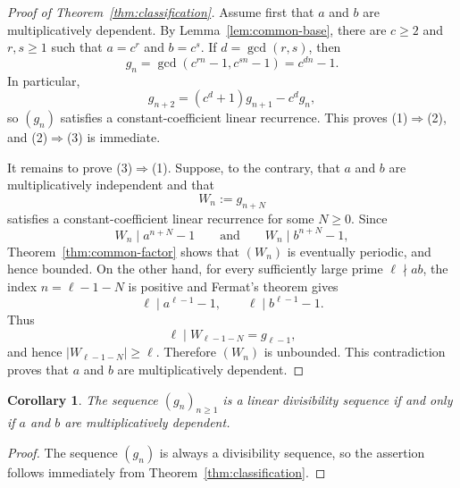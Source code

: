 \documentclass[11pt]{amsart}
\newtheorem{corollary}[theorem]{Corollary}
\theoremstyle{remark}
\numberwithin{equation}{section}
\begin{document}
\begin{proof}[Proof of Theorem~\ref{thm:classification}]
Assume first that $a$ and $b$ are multiplicatively dependent.  By
Lemma~\ref{lem:common-base}, there are $c\ge 2$ and $r,s\ge 1$ such that
$a=c^r$ and $b=c^s$.  If $d=\gcd(r,s)$, then
\[
  g_n=\gcd(c^{rn}-1,c^{sn}-1)=c^{dn}-1.
\]
In particular,
\[
  g_{n+2}=(c^d+1)g_{n+1}-c^d g_n,
\]
so $(g_n)$ satisfies a constant-coefficient linear recurrence.  This proves
\textup{(1)$\Rightarrow$(2)}, and \textup{(2)$\Rightarrow$(3)} is immediate.

It remains to prove \textup{(3)$\Rightarrow$(1)}.  Suppose, to the contrary, that
$a$ and $b$ are multiplicatively independent and that
\[
  W_n:=g_{n+N}
\]
satisfies a constant-coefficient linear recurrence for some $N\ge 0$.  Since
\[
  W_n\mid a^{n+N}-1
  \qquad\text{and}\qquad
  W_n\mid b^{n+N}-1,
\]
Theorem~\ref{thm:common-factor} shows that $(W_n)$ is eventually periodic, and
hence bounded.
On the other hand, for every sufficiently large prime $\ell\nmid ab$, the index
$n=\ell-1-N$ is positive and Fermat's theorem gives
\[
  \ell\mid a^{\ell-1}-1,
  \qquad
  \ell\mid b^{\ell-1}-1.
\]
Thus
\[
  \ell\mid W_{\ell-1-N}=g_{\ell-1},
\]
and hence $|W_{\ell-1-N}|\ge \ell$.  Therefore $(W_n)$ is unbounded.  This
contradiction proves that $a$ and $b$ are
multiplicatively dependent.
\end{proof}

\begin{corollary}\label{cor:lds-classification}
The sequence $(g_n)_{n\ge 1}$ is a linear divisibility sequence if and only if
$a$ and $b$ are multiplicatively dependent.
\end{corollary}

\begin{proof}
The sequence $(g_n)$ is always a divisibility sequence, so the assertion follows
immediately from Theorem~\ref{thm:classification}.
\end{proof}
\end{document}

